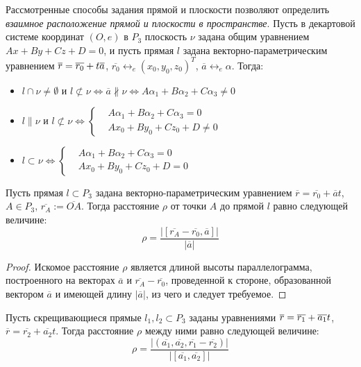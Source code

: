 \begin{note}
	Рассмотренные способы задания прямой и плоскости позволяют определить \textit{взаимное расположение прямой и плоскости в пространстве}. Пусть в декартовой системе координат $(O, e)$ в $P_3$ плоскость $\nu$ задана общим уравнением $Ax + By + Cz + D = 0$, и пусть прямая $l$ задана векторно-параметрическим уравнением $\overline{r} \hm{=} \overline{r_0} + t\overline{a}$, $\overline{r_0} \leftrightarrow_{e} (x_0, y_0, z_0)^T$, $\overline{a} \leftrightarrow_{e} \alpha$. Тогда:
	\begin{itemize}
		\item $l \cap \nu \ne \emptyset \text{ и }  l \not\subset \nu \Leftrightarrow \overline{a} \nparallel \nu \Leftrightarrow A\alpha_1 + B\alpha_2 + C\alpha_3 \ne 0$
		\item $l \parallel \nu \text{ и } l \not\subset \nu \Leftrightarrow
		\left\{\begin{aligned}
		&A\alpha_1 + B\alpha_2 + C\alpha_3 = 0\\
		&Ax_0 + By_0 + Cz_0 + D \ne 0
		\end{aligned}\right.$
		\item $l \subset \nu \Leftrightarrow
		\left\{\begin{aligned}
		&A\alpha_1 + B\alpha_2 + C\alpha_3 = 0\\
		&Ax_0 + By_0 + Cz_0 + D = 0
		\end{aligned}\right.$
	\end{itemize}
\end{note}

\begin{proposition}
	Пусть прямая $l \subset P_3$ задана векторно-параметрическим уравнением $\overline{r} = \overline{r_0} + \overline{a}t$, $A \in P_3$, $\overline{r_A} := \overline{OA}$. Тогда расстояние $\rho$ от точки $A$ до прямой $l$ равно следующей величине:
	\[\rho = \frac{|[\overline{r_A} - \overline{r_0}, \overline{a}]|}{|\overline{a}|}\]
\end{proposition}

\begin{proof}
	Искомое расстояние $\rho$ является длиной высоты параллелограмма, построенного на векторах $\overline a$ и $\overline{r_A} - \overline{r_0}$, проведенной к стороне, образованной вектором $\overline{a}$ и имеющей длину $|\overline{a}|$, из чего и следует требуемое.
\end{proof}

\begin{proposition}
	Пусть скрещивающиеся прямые $l_1, l_2 \subset P_3$ заданы уравнениями $\overline{r} = \overline{r_1} \hm{+} \overline{a_1}t$, $\overline{r} = \overline{r_2} + \overline{a_2}t$. Тогда расстояние $\rho$ между ними равно следующей величине:
	\[\rho = \frac{|(\overline{a_1}, \overline{a_2}, \overline{r_1} - \overline{r_2})|}{|[\overline{a_1}, \overline{a_2}]|}\]
\end{proposition}

